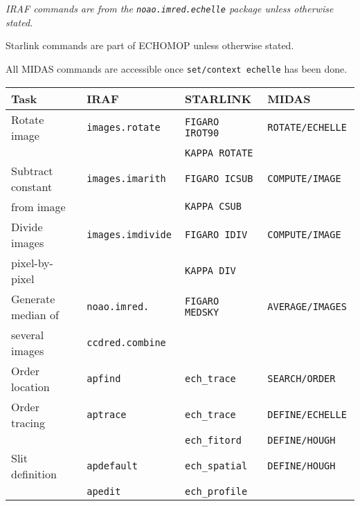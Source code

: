 \begin{latexonly}
\begin{table}
\begin{center}
{\sl
IRAF commands are from the {\tt noao.imred.echelle} package unless otherwise
stated.

Starlink commands are part of ECHOMOP unless otherwise stated.

All MIDAS commands are accessible once {\tt set/context echelle} has been done.
}
\vspace*{11pt}

\begin{tabular}{llll}
\hline\hline
{\bf Task}         & IRAF                   & STARLINK             & MIDAS                     \\
\hline\hline
Rotate image       & {\tt images.rotate   } & {\tt FIGARO IROT90 } & {\tt ROTATE/ECHELLE     } \\
                   &                        & {\tt KAPPA ROTATE  } &                           \\
Subtract constant  & {\tt images.imarith  } & {\tt FIGARO ICSUB  } & {\tt COMPUTE/IMAGE      } \\
from image         &                        & {\tt KAPPA CSUB    } &                           \\
Divide images      & {\tt images.imdivide } & {\tt FIGARO IDIV   } & {\tt COMPUTE/IMAGE      } \\
pixel-by-pixel     &                        & {\tt KAPPA DIV     } &                           \\
Generate median of & {\tt noao.imred.     } & {\tt FIGARO MEDSKY } & {\tt AVERAGE/IMAGES     } \\
several images     & {\tt ccdred.combine  } &                      &                           \\
Order location     & {\tt apfind          } & {\tt ech\_trace    } & {\tt SEARCH/ORDER       } \\
Order tracing      & {\tt aptrace         } & {\tt ech\_trace    } & {\tt DEFINE/ECHELLE     } \\
                   &                        & {\tt ech\_fitord   } & {\tt DEFINE/HOUGH       } \\
Slit definition    & {\tt apdefault       } & {\tt ech\_spatial  } & {\tt DEFINE/HOUGH       } \\
                   & {\tt apedit          } & {\tt ech\_profile  } &                           \\

\end{tabular}
\end{center}
\end{table}
\end{latexonly}
